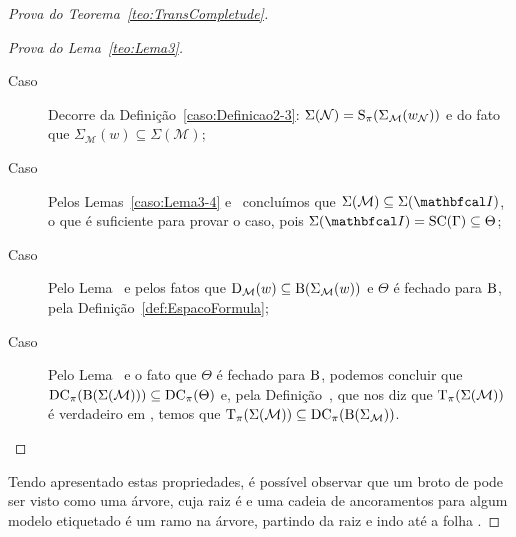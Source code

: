 \begin{apendicesenv}
\begin{proof}[Prova do Teorema~\ref{teo:TransCompletude}]
\begin{proof}[Prova do Lema~\ref{teo:Lema3}]
\begin{description}
                    \item[Caso~\textnormal{}] Decorre da Definição~\ref{caso:Definicao2-3}:
                    \(\Sigma(\mathcal{N}) = \operatorname{S}_{\pi}(\Sigma_{\mathcal{M}}(w_{\mathcal{N}}))\) e do fato que \(\Sigma_{\mathcal{M}}(w) \subseteq \Sigma(\mathcal{M})\);

                    \item[Caso~\textnormal{}] Pelos Lemas~\ref{caso:Lema3-4} e~ concluímos que
                    \(\Sigma(\mathcal{M}) \subseteq \Sigma(\modeloinicial)\), o que é suficiente para provar o caso, pois \(\Sigma(\modeloinicial) = \funcao{SC}(\Gamma) \subseteq \Theta\);

                    \item[Caso~\textnormal{}] Pelo Lema~ e pelos fatos que
                    \(\operatorname{D}_{\mathcal{M}}(w) \subseteq \operatorname{B}(\Sigma_{\mathcal{M}}(w))\) e \(\Theta\) é fechado para \(\operatorname{B}\), pela Definição~\ref{def:EspacoFormula};

                    \item[Caso~\textnormal{}] Pelo Lema~ e o fato que \(\Theta\) é fechado
                    para \(\operatorname{B}\), podemos concluir que \(\operatorname{DC}_{\pi}(\operatorname{B}(\Sigma({\mathcal{M}}))) \subseteq \operatorname{DC}_{\pi}(\Theta)\) e, pela
                    Definição~, que nos diz que \(\operatorname{T}_{\pi}(\Sigma(\mathcal{M}))\) é verdadeiro em \Mundobase,
                    temos que \(\operatorname{T}_{\pi}(\Sigma(\mathcal{M})) \subseteq \operatorname{DC}_{\pi}(\operatorname{B}(\Sigma_{\mathcal{M}}))\). \qedhere

                \end{description}
            \end{proof}

            Tendo apresentado estas propriedades, é possível observar que um broto de \Modeloinicial pode ser visto como uma árvore, cuja raiz é \Modeloinicial e
            uma cadeia de ancoramentos para algum modelo etiquetado  é um ramo na árvore, partindo da raiz e indo até a folha .


\end{proof}
\end{apendicesenv}
